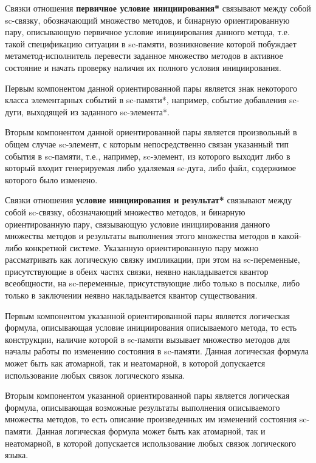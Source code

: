 Связки отношения \textbf{первичное условие инициирования*} связывают между собой sc-связку, обозначающий множество методов, и бинарную ориентированную пару, описывающую первичное условие инициирования данного метода, т.е. такой спецификацию ситуации в sc-памяти, возникновение которой побуждает метаметод-исполнитель перевести заданное множество методов в активное состояние и начать проверку наличия их полного условия инициирования.

Первым компонентом данной ориентированной пары является знак некоторого класса элементарных событий в sc-памяти*, например, событие добавления sc-дуги, выходящей из заданного sc-элемента*.

Вторым компонентом данной ориентированной пары является произвольный в общем случае sc-элемент, с которым непосредственно связан указанный тип события в sc-памяти, т.е., например, sc-элемент, из которого выходит либо в который входит генерируемая либо удаляемая sc-дуга, либо файл, содержимое которого было изменено.

Связки отношения \textbf{условие инициирования и результат*} связывают между собой sc-связку, обозначающий множество методов, и бинарную ориентированную пару, связывающую условие инициирования данного множества методов и результаты выполнения этого множества методов в какой-либо конкретной системе. Указанную ориентированную пару можно рассматривать как логическую связку импликации, при этом на sc-переменные, присутствующие в обеих частях связки, неявно накладывается квантор всеобщности, на
sc-переменные, присутствующие либо только в посылке, либо только в заключении неявно накладывается
квантор существования.

Первым компонентом указанной ориентированной пары является логическая формула, описывающая условие инициирования описываемого метода, то есть конструкции, наличие которой в sc-памяти вызывает множество методов для началы работы по изменению состояния в sc-памяти. Данная логическая формула может быть как атомарной, так и неатомарной, в которой допускается использование любых связок логического языка.

Вторым компонентом указанной ориентированной пары является логическая формула, описывающая возможные результаты выполнения описываемого множества методов, то есть описание произведенных им изменений состояния sc-памяти. Данная логическая формула может быть как атомарной, так и неатомарной, в которой допускается использование любых связок логического языка.

